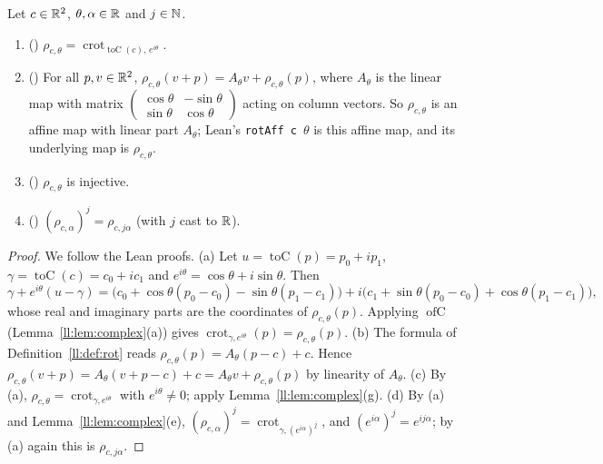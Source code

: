 \begin{lemma}\label{ll:lem:rot}
Let $c\in\mathbb R^2$, $\theta,\alpha\in\mathbb R$ and $j\in\mathbb N$.
\begin{enumerate}[label=(\alph*)]
\item () $\rho_{c,\theta}=\operatorname{crot}_{\operatorname{toC}(c),\,e^{i\theta}}$.
\item () For all $p,v\in\mathbb R^2$, $\rho_{c,\theta}(v+p)=A_\theta v+\rho_{c,\theta}(p)$, where $A_\theta$ is the
  linear map with matrix $\begin{pmatrix}\cos\theta&-\sin\theta\\ \sin\theta&\cos\theta\end{pmatrix}$ acting on column
  vectors. So $\rho_{c,\theta}$ is an affine map with linear part $A_\theta$; Lean's \texttt{rotAff c}~$\theta$ is this
  affine map, and its underlying map is $\rho_{c,\theta}$.
\item () $\rho_{c,\theta}$ is injective.
\item () $(\rho_{c,\alpha})^j=\rho_{c,j\alpha}$ (with $j$ cast to $\mathbb R$).
\end{enumerate}
\end{lemma}

\begin{proof}
We follow the Lean proofs.
(a) Let $u=\operatorname{toC}(p)=p_0+ip_1$, $\gamma=\operatorname{toC}(c)=c_0+ic_1$ and
$e^{i\theta}=\cos\theta+i\sin\theta$. Then
\[\gamma+e^{i\theta}(u-\gamma)=\bigl(c_0+\cos\theta(p_0-c_0)-\sin\theta(p_1-c_1)\bigr)
+i\bigl(c_1+\sin\theta(p_0-c_0)+\cos\theta(p_1-c_1)\bigr),\]
whose real and imaginary parts are the coordinates of $\rho_{c,\theta}(p)$. Applying $\operatorname{ofC}$
(Lemma~\ref{ll:lem:complex}(a)) gives $\operatorname{crot}_{\gamma,e^{i\theta}}(p)=\rho_{c,\theta}(p)$.
(b) The formula of Definition~\ref{ll:def:rot} reads $\rho_{c,\theta}(p)=A_\theta(p-c)+c$. Hence
$\rho_{c,\theta}(v+p)=A_\theta(v+p-c)+c=A_\theta v+\rho_{c,\theta}(p)$ by linearity of $A_\theta$.
(c) By (a), $\rho_{c,\theta}=\operatorname{crot}_{\gamma,e^{i\theta}}$ with $e^{i\theta}\ne0$; apply
Lemma~\ref{ll:lem:complex}(g).
(d) By (a) and Lemma~\ref{ll:lem:complex}(e), $(\rho_{c,\alpha})^j=\operatorname{crot}_{\gamma,(e^{i\alpha})^j}$, and
$(e^{i\alpha})^j=e^{ij\alpha}$; by (a) again this is $\rho_{c,j\alpha}$.
\end{proof}

